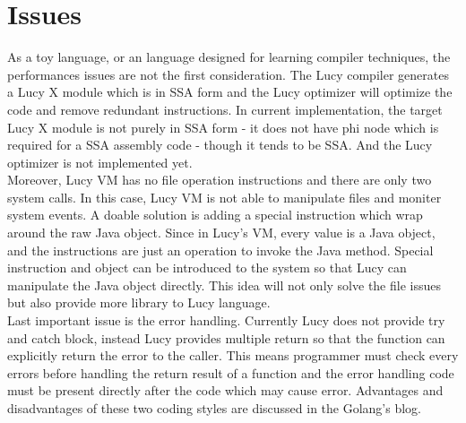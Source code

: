 \section{Issues}
As a toy language, or an language designed for learning compiler techniques, the performances issues are not the first consideration. The Lucy compiler generates a Lucy X module which is in SSA form and the Lucy optimizer will optimize the code and remove redundant instructions. In current implementation, the target Lucy X module is not purely in SSA form - it does not have phi node which is required for a SSA assembly code - though it tends to be SSA. And the Lucy optimizer is not implemented yet. \\
Moreover, Lucy VM has no file operation instructions and there are only two system calls. In this case, Lucy VM is not able to manipulate files and moniter system events. A doable solution is adding a special instruction which wrap around the raw Java object. Since in Lucy's VM, every value is a Java object, and the instructions are just an operation to invoke the Java method. Special instruction and object can be introduced to the system so that Lucy can manipulate the Java object directly. This idea will not only solve the file issues but also provide more library to Lucy language. \\
Last important issue is the error handling. Currently Lucy does not provide try and catch block, instead Lucy provides multiple return so that the function can explicitly return the error to the caller. This means programmer must check every errors before handling the return result of a function and the error handling code must be present directly after the code which may cause error. Advantages and disadvantages of these two coding styles are discussed in the Golang's blog.
